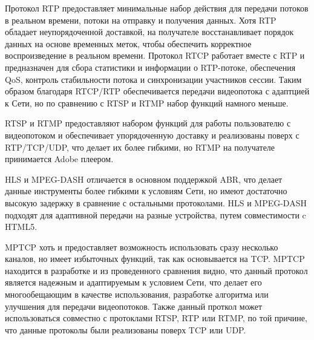 Протокол RTP предоставляет минимальные набор действия для передачи потоков в реальном времени, потоки на отправку и получения данных. Хотя RTP обладает неупорядоченной доставкой, на получателе восстанавливает порядок данных на основе временных меток, чтобы обеспечить корректное воспроизведение в реальном времени. 
Протокол RTCP работает вместе с RTP и предназначен для сбора статистики и информации о RTP-потоке, обеспечения QoS, контроль стабильности потока и синхронизации участников сессии. Таким образом благодаря RTCP/RTP обеспечивается передачи видеопотока с адаптцией к Сети, но по сравнению с RTSP и RTMP набор функций намного меньше.

RTSP и RTMP предоставляют набором функций для работы пользователю с видеопотоком и обеспечивает упорядоченную доставку и реализованы поверх с RTP/TCP/UDP, что делает их более гибкими, но RTMP на получателе принимается Adobe плеером.

HLS и MPEG-DASH отличается в основном поддержкой ABR, что делает данные инструменты более гибкими к условиям Сети, но имеют достаточно высокую задержку в сравнение с остальными протоколами. HLS и MPEG-DASH подходят для адаптивной передачи на разные устройства, путем совместимости c HTML5.

MPTCP хоть и предоставляет возможность использовать сразу несколько каналов, но имеет избыточных функций, так как основывается на TCP.
MPTCP находится в разработке и из проведенного сравнения видно, что данный протокол является надежным и адаптируемым к условием Сети, что делает его многообещающим в качестве использования, разработке алгоритма или улучшения для передачи видеопотоков. Также данный проткол может использоваться совместно с протоклами RTSP, RTP или RTMP, по той причине, что данные протоколы были реализованы поверх TCP или UDP.